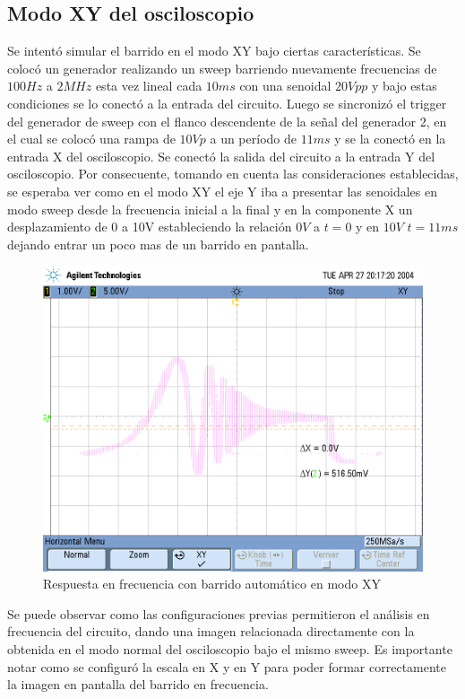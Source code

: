 \subsection{Modo XY del osciloscopio}

Se intentó simular el barrido en el modo XY bajo ciertas características.
Se colocó un generador realizando un sweep barriendo nuevamente frecuencias de $100Hz$ a $2MHz$ esta vez lineal cada $10ms$ con una senoidal
$20Vpp$ y bajo estas condiciones se lo conectó a la entrada del circuito.
Luego se sincronizó el trigger del generador de sweep con el flanco
descendente de la señal del generador 2, en el cual se colocó una
rampa de $10Vp$ a un período de $11ms$ y se la conectó en la entrada
X del osciloscopio. Se conectó la salida del circuito a la entrada
Y del osciloscopio. Por consecuente, tomando en cuenta las consideraciones
establecidas, se esperaba ver como en el modo XY el eje Y iba a presentar
las senoidales en modo sweep desde la frecuencia inicial a la final
y en la componente X un desplazamiento de 0 a 10V estableciendo la
relación $0V$ a $t=\text{0}$ y en $10V$ $t=11ms$ dejando entrar
un poco mas de un barrido en pantalla.
\begin{figure}[H]
\centering{}\includegraphics[scale=0.4]{./scope_24.png}\caption{Respuesta en frecuencia con barrido automático en modo XY}
\end{figure}

Se puede observar como las configuraciones previas permitieron el
análisis en frecuencia del circuito, dando una imagen relacionada
directamente con la obtenida en el modo normal del osciloscopio bajo
el mismo sweep. Es importante notar como se configuró la escala en
X y en Y para poder formar correctamente la imagen en pantalla del
barrido en frecuencia.

